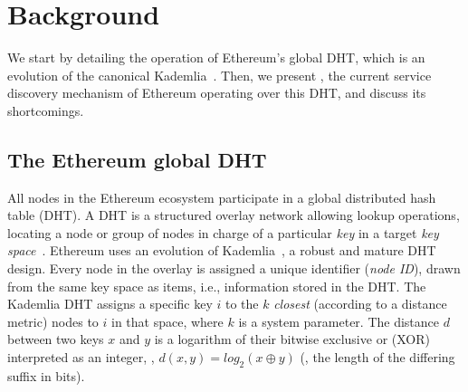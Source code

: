 

\section{Background}
\label{sec:background}

We start by detailing the operation of Ethereum's global DHT, which is an evolution of the canonical Kademlia~\cite{maymounkov2002kademlia}.
Then, we present \discv, the current service discovery mechanism of Ethereum operating over this DHT, and discuss its shortcomings.

\subsection{The Ethereum global DHT}
\label{sec:background:dht}

All nodes in the Ethereum ecosystem participate in a global distributed hash table (DHT).
A DHT is a structured overlay network allowing lookup operations, \ie locating a node or group of nodes in charge of a particular \emph{key} in a target \emph{key space}~\cite{chord,rowstron2001pastry}. 
Ethereum uses an evolution of Kademlia~\cite{maymounkov2002kademlia}, a robust and mature DHT design. %
Every node in the overlay is assigned a unique identifier (\emph{node ID}), drawn from the same key space as items, i.e., information stored in the DHT.
The Kademlia DHT assigns a specific key $i$ to the $k$ \emph{closest} (according to a distance metric) nodes to $i$ in that space, where $k$ is a system parameter.
The distance $d$ between two keys $x$ and $y$ is a logarithm of their bitwise exclusive or (XOR) interpreted as an integer, \ie, $d(x,y) = \textit{log}_2(x \oplus y)$ (\ie, the length of the differing suffix in bits).


